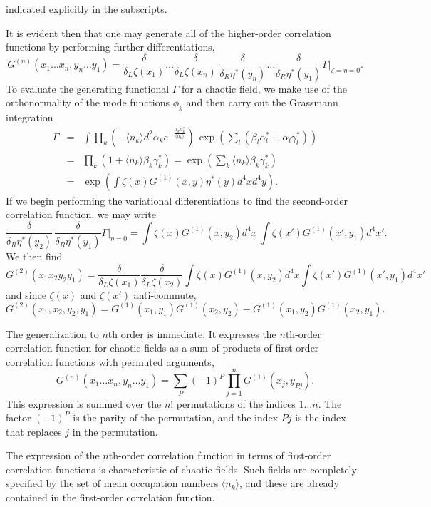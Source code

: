 \documentclass[12pt]{article}
\def\beq{\begin{equation}}
\def\eeq{\end{equation}}
\def\bea{\begin{eqnarray}}
\def\eea{\end{eqnarray}}
\def\a{\alpha}
\def\sa{\alpha^*}
\def\b{\beta}
\def\cs{\gamma^*}
\def\d{\delta}
\def\nn{\nonumber}
\begin{document}
indicated explicitly in the subscripts.
\par
It is evident then that one may generate
all of the higher-order correlation functions
by performing further differentiations, 
\beq
G^{(n)} ( x_1 \dots x_n , y_n \dots y_1 ) =
\frac{ \d }{ \d_L \zeta( x_1 ) } \dots
\frac{ \d }{ \d_L \zeta( x_n ) } \,
\frac{ \d }{ \d_R \eta^*( y_n ) } \dots
\frac{ \d }{ \d_R \eta^*( y_1 ) } \left. \Gamma \right|_{\zeta =\eta=0} .
\label {Gnzeta}
\eeq
To evaluate the generating functional $ \Gamma $
for a chaotic field, we make use of 
the orthonormality of the mode functions $ \phi_k $
and then carry out the Grassmann integration
\bea
\Gamma & = &
\int \! \prod_k \left( - \langle n_k \rangle d^2 \a_k
e^ { - \frac{ \a_k \sa_k }{ \langle n_k \rangle } } \right) \,
\exp \left( { \sum_l ( \b_l \sa_l + \a_l \cs_l ) } \right) \nn\\
& = & \prod_k \left( 1 + \langle n_k \rangle \b_k \cs_k \right) 
= \exp \left( { \sum_k \langle n_k \rangle \b_k \cs_k } \right) \nn\\
& = & \exp \left( { \int \! \zeta( x ) G^{(1)} ( x , y ) \eta^*( y ) 
d^4x d^4y } \right) .
\label {GammaG1}
\eea
If we begin performing the variational differentiations
to find the second-order correlation function,
we may write
\beq
\frac{ \d }{ \d_R \eta^*( y_2 ) } \,
\frac{ \d }{ \d_R \eta^*( y_1 ) } \left. \Gamma
\right|_{ \eta = 0 } = 
\int \! \zeta( x ) G^{(1)} ( x , y_2 ) d^4x \,
\int \! \zeta( x' ) G^{(1)} ( x', y_1 ) d^4x' .
\label {GaG1G1} 
\eeq
We then find 
\beq
G^{(2)} ( x_1 x_2 y_2 y_1 ) =  
\frac{ \d }{ \d_L \zeta( x_1 ) } 
\frac{ \d }{ \d_L \zeta( x_2 ) } 
\int \! \! \zeta( x ) G^{(1)} ( x , y_2 ) d^4x \!
\int \! \! \zeta( x' ) G^{(1)} ( x', y_1 ) d^4x' 
\eeq
and since $ \zeta( x ) $ and $ \zeta( x' ) $ anti-commute,
\beq
G^{(2)} ( x_1, x_2, y_2, y_1 )
=  G^{(1)} ( x_1, y_1 ) G^{(1)} ( x_2, y_2 ) 
- G^{(1)} ( x_1, y_2 ) G^{(1)} ( x_2, y_1 ) .
\label {G2G1G1}
\eeq 
\par
The generalization to $n$th order is immediate.
It expresses the $n$th-order correlation function
for chaotic fields as a sum of products of first-order 
correlation functions with permuted arguments,
\beq
G^{(n)} ( x_1 \dots x_n , y_n \dots y_1 ) =
\sum_P ( -1 )^P \prod_{j=1}^n G^{(1)} ( x_j , y_{Pj} ) .
\label {Gnperm}
\eeq 
This expression is summed over the $n!$ permutations
of the indices $ 1 \dots n $.
The factor $ ( -1 )^P $ is the parity of the permutation,
and the index $ Pj $ is the index that replaces $ j $
in the permutation.
\par
The expression of the $n$th-order correlation function
in terms of first-order correlation functions
is characteristic of chaotic fields.
Such fields are completely specified by the set
of mean occupation numbers $ \langle n_k \rangle $,
and these are already contained in the first-order 
correlation function.
\end{document}
